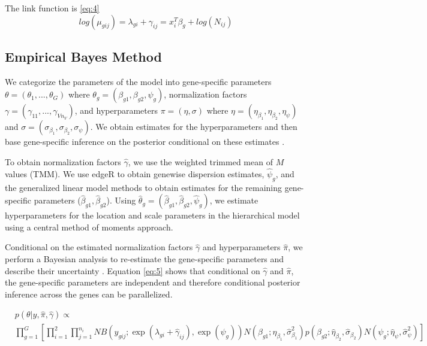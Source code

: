 \documentclass[11pt]{isuthesis}
\begin{document}
The link function is \ref{eq:4}
\begin{equation}
\label{eq:4}
log(\mu_{gij}) = \lambda_{gi} + \gamma_{ij} = x_i^T \beta_g + log(N_{ij})
\end{equation}


\subsection{Empirical Bayes Method}

We categorize the parameters of the model into gene-specific parameters $\theta = (\theta_1, ..., \theta_G)$ where $\theta_g = (\beta_{g1}, \beta_{g2}, \psi_g)$, normalization factors $\gamma = (\gamma_{11}, ..., \gamma_{V n_V})$, and hyperparameters $\pi = (\eta, \sigma)$ where $\eta = (\eta_{\beta_1}, \eta_{\beta_2}, \eta_\psi)$ and $\sigma = (\sigma_{\beta_1}, \sigma_{\beta_2}, \sigma_\psi)$. We obtain estimates for the hyperparameters and then base gene-specific inference on the posterior conditional on these estimates \citep{niemi2015empirical}.

To obtain normalization factors $\hat{\gamma}$, we use the weighted trimmed mean of $M$ values (TMM). We use edgeR to obtain genewise dispersion estimates, $\hat{\psi}_g$, and the generalized linear model methods to obtain estimates for the remaining gene-specific parameters ($\hat{\beta}_{g1}, \hat{\beta}_{g2}$)\citep{robinson2010scaling}. Using $\hat{\theta}_g = (\hat{\beta}_{g1} , \hat{\beta}_{g2}, \hat{\psi}_g)$, we estimate hyperparameters for the location and scale parameters in the hierarchical model using a central method of moments approach. 

Conditional on the estimated normalization factors $\hat{\gamma}$ and hyperparameters $\hat{\pi}$, we perform a Bayesian analysis to re-estimate the gene-specific parameters and describe their uncertainty \citep{niemi2015empirical}. Equation \ref{eq:5} shows that conditional on $\hat{\gamma}$ and $\hat{\pi}$, the gene-specific parameters are independent and therefore conditional posterior inference across the genes can be parallelized. 

\begin{equation}
\label{eq:5}
\begin{split}
& p(\theta | y, \hat{\pi}, \hat{\gamma})  \propto \\ & \prod_{g=1}^{G} \left[ \prod_{i=1}^{2} \prod_{j=1}^{n_i} NB(y_{gij} ; \exp(\lambda_{gi} + \hat{\gamma}_{ij}), \exp(\psi_g)) N(\beta_{g1} ; \hat{\eta}_{\beta_1}, \hat{\sigma}^2_{\beta_1}) p(\beta_{g2} ; \hat{\eta}_{\beta_2}, \hat{\sigma}_{\beta_2}) N(\psi_g ; \hat{\eta}_{\psi}, \hat{\sigma}^2_{\psi})  \right]
\end{split}
\end{equation}
\end{document}
